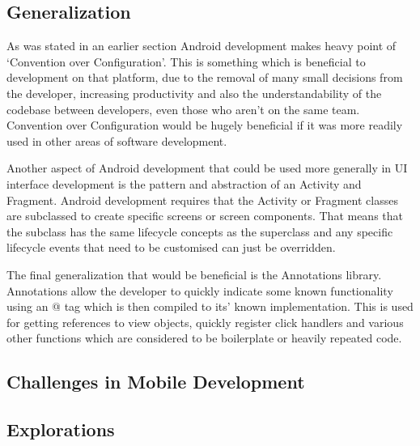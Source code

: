 \documentclass[11pt,english,numbers=endperiod,parskip=half]{scrartcl}
\begin{document}
  \subsection{Generalization}
    As was stated in an earlier section Android development makes heavy point of
    `Convention over Configuration'. This is something which is beneficial to
    development on that platform, due to the removal of many small decisions
    from the developer, increasing productivity and also the understandability
    of the codebase between developers, even those who aren't on the same team.
    Convention over Configuration would be hugely beneficial if it was more
    readily used in other areas of software development.

    Another aspect of Android development that could be used more generally in
    UI interface development is the pattern and abstraction of an Activity and
    Fragment. Android development requires that the Activity or Fragment classes
    are subclassed to create specific screens or screen components. That means
    that the subclass has the same lifecycle concepts as the superclass and
    any specific lifecycle events that need to be customised can just be
    overridden.

    The final generalization that would be beneficial is the Annotations library.
    Annotations allow the developer to quickly indicate some known functionality
    using an @ tag which is then compiled to its' known implementation. This is
    used for getting references to view objects, quickly register click handlers
    and various other functions which are considered to be boilerplate or
    heavily repeated code.

  \subsection{Challenges in Mobile Development}

  \subsection{Explorations}
\end{document}
